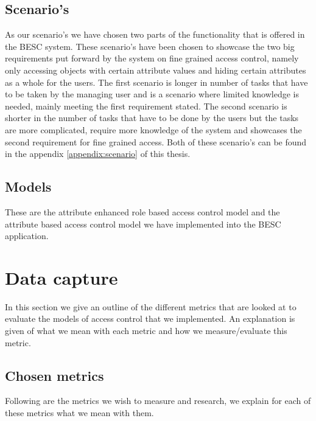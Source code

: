 \subsection{Scenario's}
As our scenario's we have chosen two parts of the functionality that is offered in the BESC system.
These scenario's have been chosen to showcase the two big requirements put forward by the system on fine grained access control, namely only accessing objects with certain attribute values and hiding certain attributes as a whole for the users.
The first scenario is longer in number of tasks that have to be taken by the managing user and is a scenario where limited knowledge is needed, mainly meeting the first requirement stated.
The second scenario is shorter in the number of tasks that have to be done by the users but the tasks are more complicated, require more knowledge of the system and showcases the second requirement for fine grained access.
Both of these scenario's can be found in the appendix \ref{appendix:scenario} of this thesis.

\subsection{Models}
These are the attribute enhanced role based access control model and the attribute based access control model we have implemented into the BESC application.

\section{Data capture}
In this section we give an outline of the different metrics that are looked at to evaluate the models of access control that we implemented.
An explanation is given of what we mean with each metric and how we measure/evaluate this metric.
\subsection{Chosen metrics}
Following are the metrics we wish to measure and research, we explain for each of these metrics what we mean with them.

